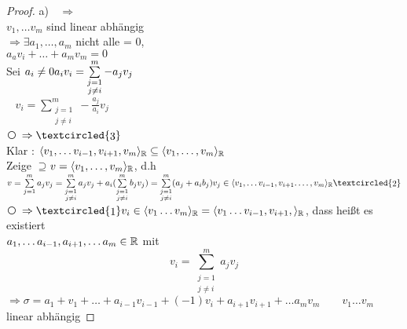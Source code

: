 \begin{proof}
a) \textcircled{\raisebox{-1pt}{1}} $\Rightarrow$ \textcircled{\raisebox{-1pt}{2}}\\
$v_1,\ldots v_m$ sind linear abhängig\\
$\Rightarrow \exists a_1,\ldots,a_m$ nicht alle = 0,\\
$a_av_i + \ldots + a_mv_m = 0$\\
Sei $a_i \ne 0\\
a_iv_i = \sum\limits_{\substack{j =1\\j\ne i}}^{m} -a_jv_j$\\
$\phantom{a_i}v_i = \sum\limits_{\substack{j =1\\j\ne i}}^{m} -\frac{a_j}{a_i}v_j$ \textcircled{\raisebox{-1pt}{2}}\\
\textcircled{\raisebox{-1pt}{2}} $\Rightarrow \textcircled{\raisebox{-1pt}{3}}$\\
Klar : $\langle v_1,\ldots v_{i-1},v_{i+1},v_m \rangle_{\mathbb{R}} \subseteq \langle v_1, \ldots ,v_m \rangle_{\mathbb{R}}$\\
Zeige $\supseteq$\quad $v  = \langle v_1,\ldots, v_m \rangle_{\mathbb{R}}$, d.h\\
$v = \sum\limits_{j=1}^{m} a_jv_j = \sum\limits_{\substack{j=1\\j\ne i}}^{m} a_jv_j + a_i (\sum\limits_{\substack{j=1\\j\ne i}}^{m} b_jv_j) = \sum\limits_{\substack{j=1\\j\ne i}}^{m} (a_j + a_i b_j)v_j \in \langle v_1,\ldots v_{i-1},v_{i+1}.\ldots,v_m \rangle_\R \textcircled{\raisebox{-1pt}{2}}$
\textcircled{\raisebox{-1pt}{3}} $ \Rightarrow \textcircled{\raisebox{-1pt}{1}}\\
v_i \in \langle v_1 \ldots v_m \rangle_\R = \langle v_1 \ldots v_{i-1}, v_{i+1}, \rangle_\R$, dass hei\ss t es existiert \\
$a_1, \ldots a_{i-1},a_{i+1},\ldots a_{m} \in \mathbb{R}$ mit \[ v_i = \sum_{\substack{j=1\\j \ne i}}^{m} a_jv_j \]
$\Rightarrow \sigma = a_1 + v_1 + \ldots + a_{i-1}v_{i-1} + (-1)v_i + a_{i+1}v_{i+1} + \ldots a_mv_m \qquad v_1\ldots v_m $ linear abhängig 
\end{proof}

